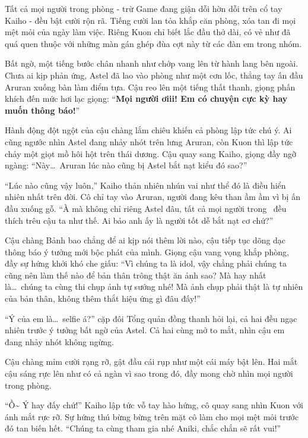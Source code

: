 \documentclass[../main.tex]{subfiles}
\begin{document}
Tất cả mọi người trong phòng - trừ Game đang giận dỗi hờn dỗi trên cổ tay Kaiho - đều bật cười rộn rã. Tiếng cười lan tỏa khắp căn phòng, xóa tan đi mọi mệt mỏi của ngày làm việc. Riêng Kuon chỉ biết lắc đầu thở dài, có vẻ như đã quá quen thuộc với những màn gán ghép đùa cợt này từ các đàn em trong nhóm.

Bất ngờ, một tiếng bước chân nhanh như chớp vang lên từ hành lang bên ngoài. Chưa ai kịp phản ứng, Astel đã lao vào phòng như một cơn lốc, thẳng tay ấn đầu Aruran xuống bàn làm điểm tựa. Cậu reo lên một tiếng thất thanh, giọng phấn khích đến mức hơi lạc giọng: ``\textbf{Mọi người ơiii! Em có chuyện cực kỳ hay muốn thông báo!}''


Hành động đột ngột của cậu chàng lắm chiêu khiến cả phòng lập tức chú ý. Ai cũng ngước nhìn Astel đang nhảy nhót trên lưng Aruran, còn Kuon thì lập tức chảy một giọt mồ hôi hột trên thái dương. Cậu quay sang Kaiho, giọng đầy ngỡ ngàng: ``Này\dots\ Aruran lúc nào cũng bị Astel bắt nạt kiểu đó sao?''

``Lúc nào cũng vậy luôn,'' Kaiho thản nhiên nhún vai như thể đó là điều hiển nhiên nhất trên đời. Cô chỉ tay vào Aruran, người đang kêu than ầm ầm vì bị ấn đầu xuống gỗ. ``À mà không chỉ riêng Astel đâu, tất cả mọi người trong \hls\ đều thích trêu cậu ta như thế. Ai bảo anh ấy là người tốt dễ bắt nạt cơ chứ?''

Cậu chàng Bảnh bao chẳng để ai kịp nói thêm lời nào, cậu tiếp tục dõng dạc thông báo ý tưởng mới bộc phát của mình. Giọng cậu vang vọng khắp phòng, đầy sự hứng khởi khó che giấu: ``Vì chúng ta là idol, vậy chẳng phải chúng ta cũng nên làm thế nào để bản thân trông thật ăn ảnh sao? Mà hay nhất là\dots\ chúng ta cùng thi chụp ảnh tự sướng nhé! Mà ảnh chụp phải thật là tự nhiên của bản thân, không thêm thắt hiệu ứng gì đâu đấy!''

``Ý của em là\dots\ selfie á?'' cặp đôi Tổng quản đồng thanh hỏi lại, cả hai đều ngạc nhiên trước ý tưởng bất ngờ của Astel. Cả hai cùng mở to mắt, nhìn cậu em đang nhảy nhót không ngừng.

Cậu chàng mỉm cười rạng rỡ, gật đầu cái rụp như một cái máy bật lên. Hai mắt cậu sáng rực lên như có cả ngàn vì sao trong đó, đầy mong chờ nhìn mọi người trong phòng.

``Ồ\~{} Ý hay đấy chứ!'' Kaiho lập tức vỗ tay hào hứng, cô quay sang nhìn Kuon với ánh mắt rực rỡ. Sự hứng thú bừng bừng trên mặt cô làm cho mọi mệt mỏi trước đó tan biến hết. ``Chúng ta cùng tham gia nhé Aniki, chắc chắn sẽ rất vui!''
\end{document}
